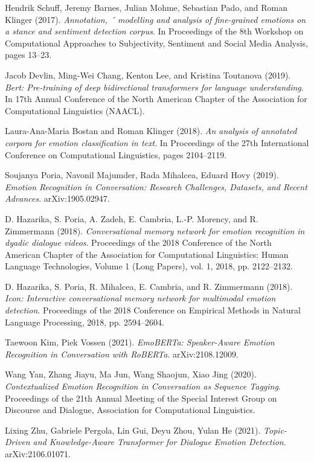 \documentclass{article}
\begin{document}
\begin{thebibliography}{9}
Hendrik Schuff, Jeremy Barnes, Julian Mohme, Sebastian Pado, and Roman Klinger (2017). \emph{Annotation, ´
modelling and analysis of fine-grained emotions on
a stance and sentiment detection corpus}. In Proceedings of the 8th Workshop on Computational Approaches to Subjectivity, Sentiment and Social Media Analysis, pages 13–23.

Jacob Devlin, Ming-Wei Chang, Kenton Lee, and
Kristina Toutanova (2019). \emph{Bert: Pre-training of deep bidirectional transformers for language understanding}. In 17th Annual Conference of the North American Chapter of the Association for Computational
Linguistics (NAACL).

Laura-Ana-Maria Bostan and Roman Klinger (2018).
\emph{An analysis of annotated corpora for emotion classification in text}. In Proceedings of the 27th International Conference on Computational Linguistics,
pages 2104–2119.

Soujanya Poria, Navonil Majumder, Rada Mihalcea, Eduard Hovy (2019). \emph{Emotion Recognition in Conversation: Research Challenges, Datasets, and Recent Advances}. arXiv:1905.02947.

D. Hazarika, S. Poria, A. Zadeh, E. Cambria, L.-P.
Morency, and R. Zimmermann (2018). \emph{Conversational memory network for emotion recognition in dyadic dialogue videos}. Proceedings of the 2018 Conference of the North American Chapter of the Association for Computational Linguistics: Human Language Technologies,
Volume 1 (Long Papers), vol. 1, 2018, pp. 2122–2132.

D. Hazarika, S. Poria, R. Mihalcea, E. Cambria, and
R. Zimmermann (2018). \emph{Icon: Interactive conversational memory network for multimodal emotion detection}. Proceedings of the 2018 Conference on Empirical Methods in Natural Language Processing, 2018, pp. 2594–2604.

Taewoon Kim, Piek Vossen (2021). \emph{EmoBERTa: Speaker-Aware Emotion Recognition in Conversation with RoBERTa}. arXiv:2108.12009. 

Wang Yan, Zhang Jiayu, Ma Jun, Wang Shaojun, Xiao Jing (2020). \emph{Contextualized Emotion Recognition in Conversation as Sequence Tagging}. Proceedings of the 21th Annual Meeting of the Special Interest Group on Discourse and Dialogue, Association for Computational Linguistics.  

Lixing Zhu, Gabriele Pergola, Lin Gui, Deyu Zhou, Yulan He (2021). \emph{Topic-Driven and Knowledge-Aware Transformer for Dialogue Emotion Detection}. arXiv:2106.01071.


\end{thebibliography}
\end{document}
